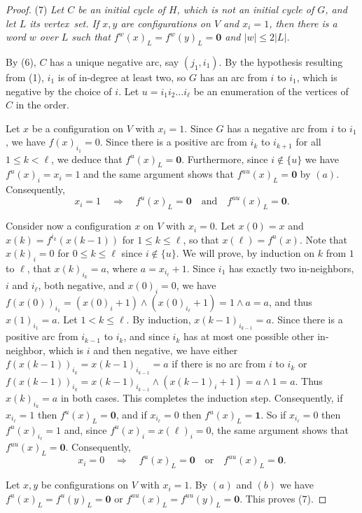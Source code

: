\documentclass[11pt,letter]{article}
\newcommand{\ONE}{\mathbf{1}}
\newcommand{\ZERO}{{\mathbf{0}}}
\begin{document}
\begin{proof}
\bigskip
\noindent
(7) {\em Let $C$ be an initial cycle of $H$, which is not an initial cycle of $G$, and let $L$ its vertex~set. If $x,y$ are configurations on $V$ and $x_i=1$, then there is a word $w$ over $L$ such that $f^w(x)_L=f^w(y)_L=\ZERO$ and $|w|\leq 2|L|$.} 

\medskip
\noindent
By (6), $C$ has a unique negative arc, say $(j_1,i_1)$. By the hypothesis resulting from (1), $i_1$ is of in-degree at least two, so $G$ has an arc from $i$ to $i_1$, which is negative by the choice of $i$. Let $u=i_1i_2\dots i_\ell$ be an enumeration of the vertices of $C$ in the order. 

\medskip
Let $x$ be a configuration on $V$ with $x_i=1$. Since $G$ has a negative arc from $i$ to $i_1$, we have $f(x)_{i_1}=0$. Since there is a positive arc from $i_k$ to $i_{k+1}$ for all $1\leq k<\ell$, we deduce that $f^u(x)_L=\ZERO$. Furthermore, since $i\not\in\{u\}$ we have $f^u(x)_i=x_i=1$ and the same argument shows that $f^{uu}(x)_L=\ZERO$ by $(a)$. Consequently,
\[\tag{$a$}
x_i=1\quad\Rightarrow\quad f^u(x)_L=\ZERO\quad\textrm{and}\quad f^{uu}(x)_L=\ZERO.
\]

\medskip
Consider now a configuration $x$ on $V$ with $x_i=0$. Let $x(0)=x$ and $x(k)=f^{i_k}(x(k-1))$ for $1\leq k\leq \ell$, so that $x(\ell)=f^u(x)$. Note that $x(k)_i=0$ for $0\leq k\leq\ell$ since $i\not\in\{u\}$. We will prove, by induction on $k$ from $1$ to $\ell$, that $x(k)_{i_k}=a$, where $a=x_{i_\ell}+1$. Since $i_1$ has exactly two in-neighbors, $i$ and $i_\ell$, both negative, and $x(0)_i=0$, we have $f(x(0))_{i_1}=(x(0)_i+1)\land (x(0)_{i_\ell}+1)=1\land a=a$,  and thus $x(1)_{i_1}=a$. Let $1<k\leq\ell$. By induction, $x(k-1)_{i_{k-1}}=a$. Since there is a positive arc from $i_{k-1}$ to $i_k$, and since $i_k$ has at most one possible other in-neighbor, which is $i$ and then negative, we have either $f(x(k-1))_{i_k}=x(k-1)_{i_{k-1}}=a$ if there is no arc from $i$ to $i_k$ or $f(x(k-1))_{i_k}=x(k-1)_{i_{k-1}}\land (x(k-1)_i+1)=a\land 1=a$. Thus $x(k)_{i_k}=a$ in both cases. This completes the induction step. Consequently, if $x_{i_\ell}=1$ then $f^u(x)_L=\ZERO$, and if $x_{i_\ell}=0$ then $f^u(x)_L=\ONE$. So if $x_{i_\ell}=0$ then $f^u(x)_{i_\ell}=1$ and, since $f^{u}(x)_i=x(\ell)_i=0$, the same argument shows that $f^{uu}(x)_L=\ZERO$. Consequently, 
\[\tag{$b$}
x_i=0\quad\Rightarrow\quad f^u(x)_L=\ZERO\quad\textrm{or}\quad f^{uu}(x)_L=\ZERO.
\]

\medskip
Let $x,y$ be configurations on $V$ with $x_i=1$. By $(a)$ and $(b)$ we have $f^u(x)_L=f^u(y)_L=\ZERO$ or  $f^{uu}(x)_L=f^{uu}(y)_L=\ZERO$. This proves (7).


\end{proof}
\end{document}
